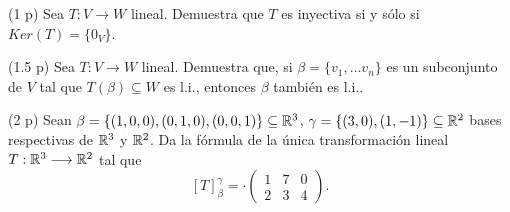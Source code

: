 \begin{prob}
(1 p) 
Sea $T: V \longrightarrow W$ lineal. Demuestra que $T$ 
es inyectiva si y sólo si $Ker(T) = \{ 0_{V} \}$.
\end{prob}


\begin{prob}
(1.5 p)
Sea $T: V \longrightarrow W$ lineal. Demuestra que, si 
$\beta = \{ v_{1}, \ldots v_{n} \}$ es un subconjunto de $V$
tal que $T(\beta) \subseteq W$
es l.i., entonces $\beta$ también es l.i..
\end{prob}



\begin{prob}
(2 p) Sean 
$
\beta = \{ (1, 0, 0), (0, 1, 0), (0, 0, 1) \}\subseteq \mathbb{R}^{3}$,
$
\gamma = \{ (3, 0), (1, -1) \} \subseteq \mathbb{R}^{2} $
bases respectivas de $\mathbb{R}^{3}$ y $\mathbb{R}^{2}$.
Da la fórmula de 
la única transformación lineal $T: \mathbb{R}^{3} \longrightarrow \mathbb{R}^{2}$
tal que 
$$
[T]_{\beta}^{\gamma} = ·\begin{pmatrix}
1 & 7 & 0 \\
2 & 3 & 4
\end{pmatrix}.
$$
\end{prob}

